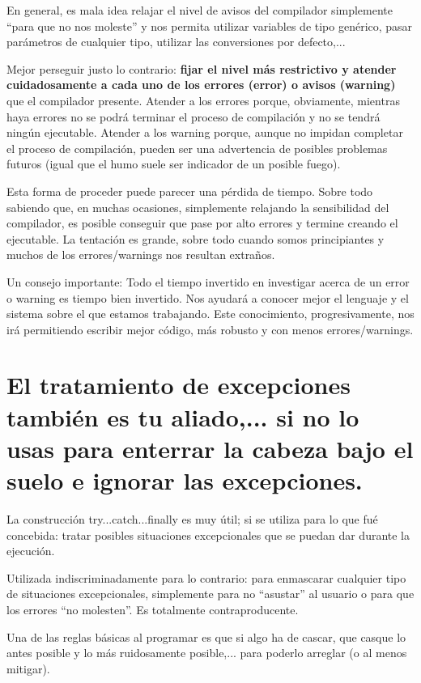\documentclass[spanish,12pt,a4paper,final,oneside]{book}
\begin{document}
En general, es mala idea relajar el nivel de avisos del compilador simplemente ``para que no nos moleste'' y nos permita utilizar variables de tipo genérico, pasar parámetros de cualquier tipo, utilizar las conversiones por defecto,... 

Mejor perseguir justo lo contrario: \textbf{fijar el nivel más restrictivo y atender cuidadosamente a cada uno de los errores (error) o avisos (warning)} que el compilador presente. Atender a los errores porque, obviamente, mientras haya errores no se podrá terminar el proceso de compilación y no se tendrá ningún ejecutable. Atender a los warning porque, aunque no impidan completar el proceso de compilación, pueden ser una advertencia de posibles problemas futuros (igual que el humo suele ser indicador de un posible fuego).

Esta forma de proceder puede parecer una pérdida de tiempo. Sobre todo sabiendo que, en muchas ocasiones, simplemente relajando la sensibilidad del compilador, es posible conseguir que pase por alto errores y termine creando el ejecutable. La tentación es grande, sobre todo cuando somos principiantes y muchos de los errores/warnings nos resultan extraños.

Un consejo importante: Todo el tiempo invertido en investigar acerca de un error o warning es tiempo bien invertido. Nos ayudará a conocer mejor el lenguaje y el sistema sobre el que estamos trabajando. Este conocimiento, progresivamente, nos irá permitiendo escribir mejor código, más robusto y con menos errores/warnings.

\section{El tratamiento de excepciones también es tu aliado,... si no lo usas para enterrar la cabeza bajo el suelo e ignorar las excepciones.}
La construcción try...catch...finally es muy útil; si se utiliza para lo que fué concebida: tratar posibles situaciones excepcionales que se puedan dar durante la ejecución. 

Utilizada indiscriminadamente para lo contrario: para enmascarar cualquier tipo de situaciones excepcionales, simplemente para no ``asustar'' al usuario o para que los errores ``no molesten''. Es totalmente contraproducente. 

Una de las reglas básicas al programar es que si algo ha de cascar, que casque lo antes posible y lo más ruidosamente posible,... para poderlo arreglar (o al menos mitigar). 
\end{document}
